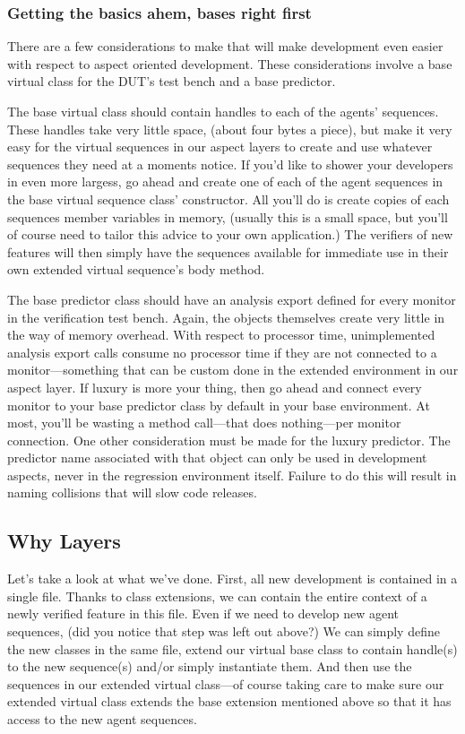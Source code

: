 \documentclass[twocolumn,letterpaper]{IEEEAerospaceCLS}  %
\begin{document}
\subsubsection{Getting the basics ahem, bases right first}
There are a few considerations to make that will make development even easier with respect to aspect oriented development. These considerations involve a base virtual class for the DUT's test bench and a base predictor.

The base virtual class should contain handles to each of the agents' sequences. These handles take very little space, (about four bytes a piece), but make it very easy for the virtual sequences in our aspect layers to create and use whatever sequences they need at a moments notice. If you'd like to shower your developers in even more largess, go ahead and create one of each of the agent sequences in the base virtual sequence class' constructor. All you'll do is create copies of each sequences member variables in memory, (usually this is a small space, but you'll of course need to tailor this advice to your own application.) The verifiers of new features will then simply have the sequences available for immediate use in their  own extended virtual sequence's body method.

The base predictor class should have an analysis export defined for every monitor in the verification test bench. Again, the objects themselves create very little in the way of memory overhead. With respect to processor time, unimplemented analysis export calls consume no processor time if they are not connected to a monitor—something that can be custom done in the extended environment in our aspect layer. If luxury is more your thing, then go ahead and connect every monitor to your base predictor class by default in your base environment. At most, you'll be wasting a method call—that does nothing—per monitor connection. One other consideration must be made for the luxury predictor. The predictor name associated with that object can only be used in development aspects,  never in the regression environment itself. Failure to do this will result in naming collisions that will slow code releases.

\subsection{Why Layers}
Let's take a look at what we've done. First, all new development is contained in a single file. Thanks to class extensions, we can contain the entire context of a newly verified feature in this file. Even if we need to develop new agent sequences, (did you notice that step was left out above?) We can simply define the new classes in the same file, extend our virtual base class to contain handle(s) to the new sequence(s) and/or simply instantiate them. And then use the sequences in our extended virtual class—of course taking care to make sure our extended virtual class extends the base extension mentioned above so that it has access to the new agent sequences.
\end{document}
